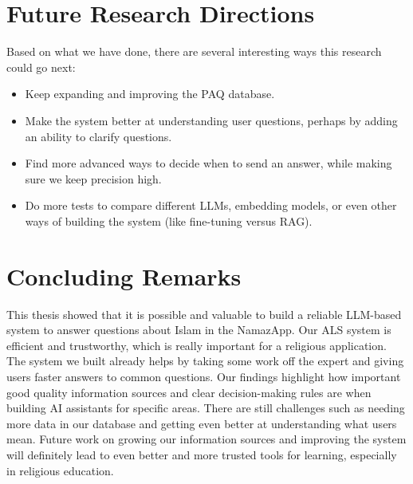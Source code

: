 \section{Future Research Directions}
\label{sec:conc_future_work}
Based on what we have done, there are several interesting ways this research could go next:
\begin{itemize}
\item Keep expanding and improving the PAQ database.
\item Make the system better at understanding user questions, perhaps by adding an ability to clarify questions.
\item Find more advanced ways to decide when to send an answer, while making sure we keep precision high.
\item Do more tests to compare different LLMs, embedding models, or even other ways of building the system (like fine-tuning versus RAG).
\end{itemize}
\section{Concluding Remarks}
\label{sec:conc_remarks}
This thesis showed that it is possible and valuable to build a reliable LLM-based system to answer questions about Islam in the NamazApp. Our ALS system is efficient and trustworthy, which is really important for a religious application. The system we built already helps by taking some work off the expert and giving users faster answers to common questions.
Our findings highlight how important good quality information sources and clear decision-making rules are when building AI assistants for specific areas. There are still challenges such as needing more data in our database and getting even better at understanding what users mean. Future work on growing our information sources and improving the system will definitely lead to even better and more trusted tools for learning, especially in religious education.